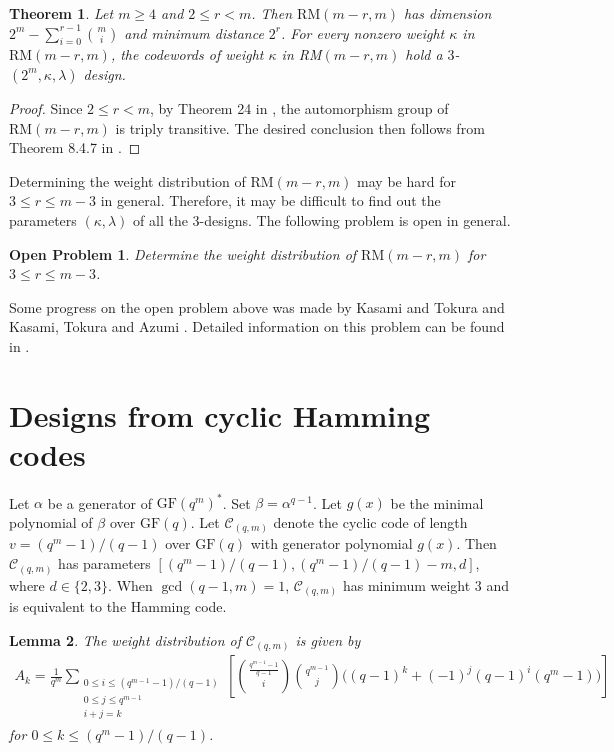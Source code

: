 \documentclass[1p,final]{elsarticle}
\newtheorem{theorem}{Theorem}
\newtheorem{lemma}[theorem]{Lemma}
\newtheorem{open}{Open Problem}
\newcommand{\gf}{{\mathrm{GF}}}
\newcommand{\RM}{{\mathrm{RM}}}
\newcommand{\C}{{\mathcal{C}}}
\begin{document}
\begin{theorem}\label{thm-brmdesign2}
Let $m \geq 4$ and $2 \leq r < m$. Then $\RM(m-r, m)$ has dimension $2^m -\sum_{i=0}^{r-1} \binom{m}{i}$ and
minimum distance $2^r$. For every nonzero weight $\kappa$ in $\RM(m-r, m)$, the codewords
of weight $\kappa$ in RM$(m-r, m)$ hold a $3$-$(2^m, \kappa, \lambda)$ design.
\end{theorem}

\begin{proof}
Since $2 \leq r < m$, by Theorem 24 in \cite[p. 400]{MS77}, the automorphism group of $\RM(m-r, m)$ 
is triply transitive. The desired conclusion then follows from Theorem 8.4.7 in \cite[p. 308]{HP03}. 
\end{proof}



Determining the weight distribution of $\RM(m-r, m)$ may be hard for $3 \leq r \leq m-3$ in general. 
Therefore, it may be difficult to find out the parameters $(\kappa, \lambda)$ of all the $3$-designs. 
The following problem is open in general.  

\begin{open} 
Determine the weight distribution of $\RM(m-r, m)$ for $3 \leq r \leq m-3$. 
\end{open} 

Some progress on the open problem above was made by Kasami and Tokura \cite{KT} and 
Kasami, Tokura and Azumi \cite{KTA}. Detailed information on this problem can be found 
in \cite[Chapter 15]{MS77}.  




\section{Designs from cyclic Hamming codes}\label{sec-hmdesigns}


Let $\alpha$ be a generator of $\gf(q^m)^*$. Set $\beta=\alpha^{q-1}$. Let $g(x)$ be the minimal polynomial of $\beta$ over
$\gf(q)$. Let $\C_{(q,m)}$ denote the cyclic code of length $v=(q^m-1)/(q-1)$ over $\gf(q)$ with generator polynomial $g(x)$.
Then $\C_{(q,m)}$ has parameters $[(q^m-1)/(q-1), (q^m-1)/(q-1)-m, d]$, where $d \in \{2,3\}$.
When $\gcd(q-1, m)=1$, $\C_{(q,m)}$ has minimum weight $3$ and is equivalent to the Hamming code.

\begin{lemma}\label{lem-HCwt}
The weight distribution of $\C_{(q,m)}$ is given by
\begin{eqnarray*}
A_{k}= \frac{1}{q^m} \sum_{\substack {0 \le i \le (q^{m-1}-1)/(q-1) \\0 \le j \le q^{m-1} \\ i+j=k}}\left[\binom{\frac{q^{m-1}-1}{q-1}}{i}
 \binom{q^{m-1}}{j}\Big((q-1)^k+(-1)^j(q-1)^i(q^m-1)\Big)\right]
\end{eqnarray*}
for $0 \leq k \leq (q^m-1)/(q-1)$.
\end{lemma}
\end{document}
